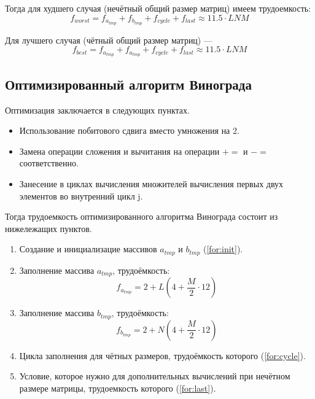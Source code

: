 Тогда для худшего случая (нечётный общий размер матриц) имеем трудоемкость:
\begin{equation}
	\label{for:bad}
	f_{worst} =  f_{a_{tmp}} + f_{b_{tmp}} + f_{cycle} + f_{last}\approx 11.5 \cdot LNM
\end{equation}

Для лучшего случая (чётный общий размер матриц) ---
\begin{equation}
	\label{for:good}
	f_{best} =  f_{a_{tmp}} + f_{a_{tmp}} + f_{cycle} + f_{last} \approx 11.5 \cdot LNM
\end{equation}


\subsection{Оптимизированный алгоритм Винограда}

Оптимизация заключается в следующих пунктах.
\begin{itemize}
	\item Использование побитового сдвига вместо умножения на 2.
	\item Замена операции сложения и вычитания на операции $+=$ и $-=$ соответственно.
	\item Занесение в циклах вычисления множителей вычисления первых двух
	элементов во внутренний цикл j.
\end{itemize}

Тогда трудоемкость оптимизированного алгоритма Винограда состоит из нижележащих пунктов.

\begin{enumerate}
	\item Создание и инициализацие массивов $a_{tmp}$ и $b_{tmp}$ (\ref{for:init}).
	
	\item Заполнение массива $a_{tmp}$, трудоёмкость:
	\begin{equation}
		\label{for:ATMP1}
		f_{a_{tmp}} = 2 + L (4 + \frac{M}{2} \cdot 12)
	\end{equation}
	
	\item Заполнение массива $b_{tmp}$, трудоёмкость:
	\begin{equation}
		\label{for:BTMP1}
		f_{b_{tmp}} = 2 + N (4 + \frac{M}{2} \cdot 12)
	\end{equation}
	\newline
	\item Цикла заполнения для чётных размеров, трудоёмкость которого (\ref{for:cycle}).
	
	\item Условие, которое нужно для дополнительных вычислений при нечётном размере матрицы, трудоемкость которого (\ref{for:last}).
	
\end{enumerate}

